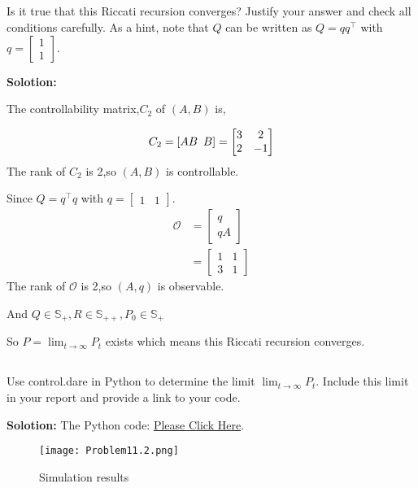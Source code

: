 \documentclass[a4paper,11pt,reqno]{amsart}
\newcommand{\tran}{\intercal}
\begin{document}
\subsection{}
Is it true that this Riccati recursion converges? Justify your answer and check all conditions
carefully. As a hint, note that $Q$ can be written as $Q = qq^{\tran}$ with $q =\begin{bmatrix} 1 \\ 1 \end{bmatrix}$. 

\textbf{Solotion:}

The controllability matrix,$C_2$ of $(A,B)$ is,

$$
\begin{aligned}
    C_2=[AB \hspace{0.5em} B]=\begin{bmatrix} 3 & 2 \\ 2 & -1 \end{bmatrix}
\end{aligned}
$$
The rank of $C_2$ is 2,so $(A,B)$ is controllable.

Since $Q = q^{\tran}q$ with $q =\begin{bmatrix} 1 & 1 \end{bmatrix}$. 
$$
\begin{aligned}
    \mathcal{O}&=\begin{bmatrix} q \\ qA \end{bmatrix}
    \\
    &=\begin{bmatrix} 1 & 1 \\ 3 & 1 \end{bmatrix}
\end{aligned}
$$
The rank of $\mathcal{O}$ is 2,so $(A,q)$ is observable.

And $Q\in\mathbb{S}_+,R\in\mathbb{S}_{++},P_0\in\mathbb{S}_+$

So $P=\lim_{t\rightarrow\infty}P_t$ exists which means this Riccati recursion converges.

\subsection{}
Use control.dare in Python to determine the limit $\lim_{t\rightarrow\infty} P_t$. Include this limit in your report
and provide a link to your code.

\textbf{Solotion:}
The Python code: \href{https://github.com/Chanawesome/ELE8088-EXTRA/blob/main/Problem11.2.py}{Please Click Here}.
\begin{figure}[H]
    \centering
    \texttt{[image: Problem11.2.png]}
    \caption{Simulation results}
\end{figure}
\end{document}
